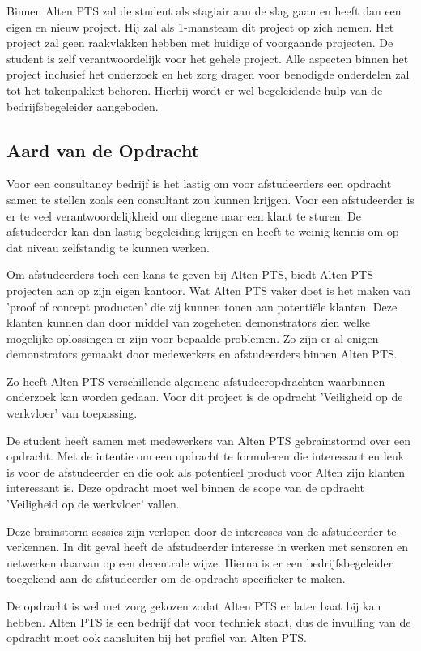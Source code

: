 \documentclass{../local}
\begin{document}
Binnen Alten PTS zal de student als stagiair aan de slag gaan en heeft dan een eigen en nieuw project. Hij zal als 1-mansteam dit project op zich nemen. Het project zal geen raakvlakken hebben met huidige of voorgaande projecten. De student is zelf verantwoordelijk voor het gehele project. Alle aspecten binnen het project inclusief het onderzoek en het zorg dragen voor benodigde onderdelen zal tot het takenpakket behoren. Hierbij wordt er wel begeleidende hulp van de bedrijfsbegeleider aangeboden.

\subsection{Aard van de Opdracht}

Voor een consultancy bedrijf is het lastig om voor afstudeerders een opdracht samen te stellen zoals een consultant zou kunnen krijgen. Voor een afstudeerder is er te veel verantwoordelijkheid om diegene naar een klant te sturen. De afstudeerder kan dan lastig begeleiding krijgen en heeft te weinig kennis om op dat niveau zelfstandig te kunnen werken.

Om afstudeerders toch een kans te geven bij Alten PTS, biedt Alten PTS projecten aan op zijn eigen kantoor. Wat Alten PTS vaker doet is het maken van 'proof of concept producten' die zij kunnen tonen aan potentiële klanten. Deze klanten kunnen dan door middel van zogeheten demonstrators zien welke mogelijke oplossingen er zijn voor bepaalde problemen. Zo zijn er al enigen demonstrators gemaakt door medewerkers en afstudeerders binnen Alten PTS.

Zo heeft Alten PTS verschillende algemene afstudeeropdrachten waarbinnen onderzoek kan worden gedaan. Voor dit project is de opdracht 'Veiligheid op de werkvloer' van toepassing.

De student heeft samen met medewerkers van Alten PTS gebrainstormd over een opdracht. Met de intentie om een opdracht te formuleren die interessant en leuk is voor de afstudeerder en die ook als potentieel product voor Alten zijn klanten interessant is. Deze opdracht moet wel binnen de scope van de opdracht 'Veiligheid op de werkvloer' vallen.

Deze brainstorm sessies zijn verlopen door de interesses van de afstudeerder te verkennen. In dit geval heeft de afstudeerder interesse in werken met sensoren en netwerken daarvan op een decentrale wijze. Hierna is er een bedrijfsbegeleider toegekend aan de afstudeerder om de opdracht specifieker te maken.

De opdracht is wel met zorg gekozen zodat Alten PTS er later baat bij kan hebben. Alten PTS is een bedrijf dat voor techniek staat, dus de invulling van de opdracht moet ook aansluiten bij het profiel van Alten PTS.
\end{document}
